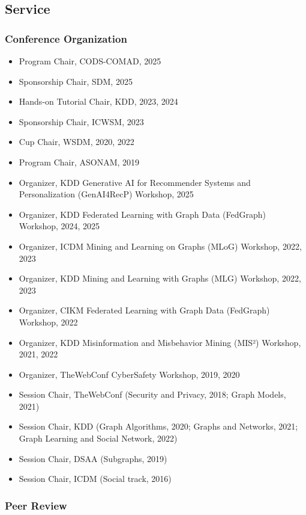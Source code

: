 \documentclass{article}
\begin{document}
\subsection*{\bf {Service}}

\subsubsection*{\bf {Conference Organization}}

\begin{itemize}
\item Program Chair, CODS-COMAD, 2025
\item Sponsorship Chair, SDM, 2025
\item Hands-on Tutorial Chair, KDD, 2023, 2024
\item Sponsorship Chair, ICWSM, 2023
\item Cup Chair, WSDM, 2020, 2022
\item Program Chair, ASONAM, 2019
\item Organizer, KDD Generative AI for Recommender Systems and Personalization (GenAI4RecP) Workshop, 2025
\item Organizer, KDD Federated Learning with Graph Data (FedGraph) Workshop, 2024, 2025
\item Organizer, ICDM Mining and Learning on Graphs (MLoG) Workshop, 2022, 2023
\item Organizer, KDD Mining and Learning with Graphs (MLG) Workshop, 2022, 2023
\item Organizer, CIKM Federated Learning with Graph Data (FedGraph) Workshop, 2022
\item Organizer, KDD Misinformation and Misbehavior Mining (MIS²) Workshop, 2021, 2022
\item Organizer, TheWebConf CyberSafety Workshop, 2019, 2020
\item Session Chair, TheWebConf (Security and Privacy, 2018; Graph Models, 2021)
\item Session Chair, KDD (Graph Algorithms, 2020; Graphs and Networks, 2021; Graph Learning and Social Network, 2022)
\item Session Chair, DSAA (Subgraphs, 2019)
\item Session Chair, ICDM (Social track, 2016)
\end{itemize}

\subsubsection*{\bf {Peer Review}}
\end{document}
